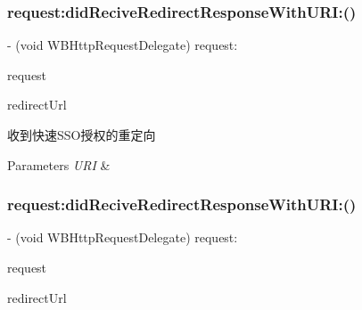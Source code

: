 \subsubsection{\texorpdfstring{request\+:did\+Recive\+Redirect\+Response\+With\+U\+R\+I\+:()}{request:didReciveRedirectResponseWithURI:()}\hspace{0.1cm}{\footnotesize\ttfamily [1/3]}}
{\footnotesize\ttfamily -\/ (void W\+B\+Http\+Request\+Delegate) request\+: \begin{DoxyParamCaption}\item[{(\mbox{\hyperlink{interface_w_b_http_request}{W\+B\+Http\+Request}} $\ast$)}]{request }\item[{didReciveRedirectResponseWithURI:(N\+S\+U\+RL $\ast$)}]{redirect\+Url }\end{DoxyParamCaption}\hspace{0.3cm}{\ttfamily [optional]}}

收到快速\+S\+S\+O授权的重定向


\begin{DoxyParams}{Parameters}
{\em U\+RI} & \\
\hline
\end{DoxyParams}
\mbox{\label{protocol_w_b_http_request_delegate_01-p_a6ffae01d073b8ac55c7bdf8e62ca9576}} 
\subsubsection{\texorpdfstring{request\+:did\+Recive\+Redirect\+Response\+With\+U\+R\+I\+:()}{request:didReciveRedirectResponseWithURI:()}\hspace{0.1cm}{\footnotesize\ttfamily [2/3]}}
{\footnotesize\ttfamily -\/ (void W\+B\+Http\+Request\+Delegate) request\+: \begin{DoxyParamCaption}\item[{(\mbox{\hyperlink{interface_w_b_http_request}{W\+B\+Http\+Request}} $\ast$)}]{request }\item[{didReciveRedirectResponseWithURI:(N\+S\+U\+RL $\ast$)}]{redirect\+Url }\end{DoxyParamCaption}\hspace{0.3cm}{\ttfamily [optional]}}

